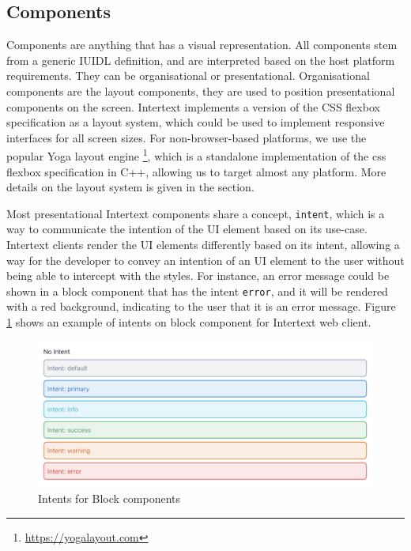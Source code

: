\subsection{Components}

Components are anything that has a visual representation. All components stem from a generic IUIDL definition, and are interpreted based on the host platform requirements. They can be organisational or presentational. Organisational components are the layout components, they are used to position presentational components on the screen. Intertext implements a version of the CSS flexbox specification as a layout system, which could be used to implement responsive interfaces for all screen sizes. For non-browser-based platforms, we use the popular Yoga layout engine \footnote{\url{https://yogalayout.com}}, which is a standalone implementation of the css flexbox specification in C++, allowing us to target almost any platform. More details on the layout system is given in the  section.

Most presentational Intertext components share a concept, \texttt{intent}, which is a way to communicate the intention of the UI element based on its use-case. Intertext clients render the UI elements differently based on its intent, allowing a way for the developer to convey an intention of an UI element to the user without being able to intercept with the styles. For instance, an error message could be shown in a block component that has the intent \texttt{error}, and it will be rendered with a red background, indicating to the user that it is an error message. Figure \ref{fig:intents} shows an example of intents on block component for Intertext web client.

\begin{figure}[htb]
  \centering
  \includegraphics[width=13cm]{thesis/paper/images/intents.png}
  \caption{Intents for Block components}%
  \label{fig:intents}%
\end{figure}

